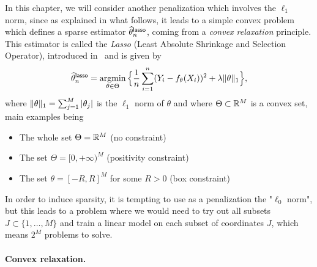 In this chapter, we will consider another penalization which involves the $\ell_1$ norm, since as explained in what follows, it leads to a simple convex problem which defines a sparse estimator $\widehat \theta_n^{\mathsf{lasso}}$, coming from a \emph{convex relaxation} principle.
This estimator is called the \emph{Lasso} (Least Absolute Shrinkage and Selection Operator), introduced in~ and is given by
\begin{equation}
	\label{eq:lasso-def}
		\widehat \theta_n^{\mathsf{lasso}} = \operatorname*{argmin}_{\theta \in \Theta} 
		\Big\{ \frac 1n \sum_{i=1}^n (Y_i - f_\theta(X_i))^2 + \lambda \| \theta \|_1 \Big\},
\end{equation}
where $\| \theta \|_1 = \sum_{j=1}^M |\theta_j|$ is the $\ell_1$ norm of $\theta$ and where $\Theta \subset \mathbb R^M$ is a convex set, main examples being
\begin{itemize}
 	\item The whole set $\Theta = \mathbb R^M$ (no constraint)
 	\item The set $\Theta = [0, +\infty)^M$ (positivity constraint)
 	\item The set $\theta = [-R, R]^M$ for some $R > 0$ (box constraint)
 \end{itemize}
In order to induce sparsity, it is tempting to use as a penalization the "$\ell_0$ norm", but this leads to a problem where we would need to try out all subsets $J \subset \{ 1, \ldots, M \}$ and train a linear model on each subset of coordinates $J$, which means $2^M$ problems to solve.

\paragraph{Convex relaxation.} %

